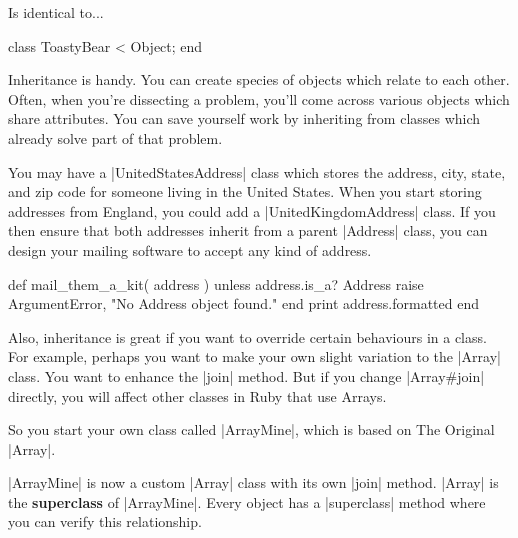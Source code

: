 \documentclass[12pt,twoside]{report}
\begin{document}
Is identical to...


\begin{rubycode}

 class ToastyBear < Object; end

\end{rubycode}


Inheritance is handy.  You can create species of objects which relate
to each other. Often, when you're dissecting a problem, you'll come
across various objects which share attributes.  You can save yourself
work by inheriting from classes which already solve part of that
problem.

You may have a \rubyinline|UnitedStatesAddress| class
which stores the address, city, state, and zip code for someone living
in the United States.  When you start storing addresses from England,
you could add a \rubyinline|UnitedKingdomAddress|
class.  If you then ensure that both addresses inherit from a parent
\rubyinline|Address| class, you can design your
mailing software to accept any kind of address.


\begin{rubycode}

 def mail_them_a_kit( address )
   unless address.is_a? Address
     raise ArgumentError, "No Address object found."
   end
   print address.formatted
 end

\end{rubycode}


Also, inheritance is great if you want to override certain behaviours
in a class. For example, perhaps you want to make your own slight
variation to the \rubyinline|Array| class. You want to
enhance the \rubyinline|join| method.  But if you
change \rubyinline|Array#join| directly, you will
affect other classes in Ruby that use Arrays.

So you start your own class called
\rubyinline|ArrayMine|, which is based on The Original
\rubyinline|Array|.




\rubyinline|ArrayMine| is now a custom
\rubyinline|Array| class with its own
\rubyinline|join| method.
\rubyinline|Array| is the {\bf superclass} of
\rubyinline|ArrayMine|.  Every object has a
\rubyinline|superclass| method where you can verify
this relationship.
\end{document}
